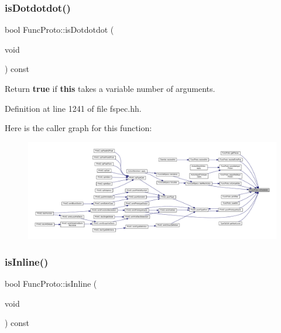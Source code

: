\subsubsection{\texorpdfstring{isDotdotdot()}{isDotdotdot()}}
{\footnotesize\ttfamily bool Func\+Proto\+::is\+Dotdotdot (\begin{DoxyParamCaption}\item[{void}]{ }\end{DoxyParamCaption}) const\hspace{0.3cm}{\ttfamily [inline]}}



Return {\bfseries{true}} if {\bfseries{this}} takes a variable number of arguments. 



Definition at line 1241 of file fspec.\+hh.

Here is the caller graph for this function\+:
\nopagebreak
\begin{figure}[H]
\begin{center}
\leavevmode
\includegraphics[width=350pt]{class_func_proto_a4f4e0521c603ad73b2d73ad96f8cb954_icgraph}
\end{center}
\end{figure}
\mbox{\label{class_func_proto_a1195921be7caf4244970a23b0eafef67}} 
\subsubsection{\texorpdfstring{isInline()}{isInline()}}
{\footnotesize\ttfamily bool Func\+Proto\+::is\+Inline (\begin{DoxyParamCaption}\item[{void}]{ }\end{DoxyParamCaption}) const\hspace{0.3cm}{\ttfamily [inline]}}



